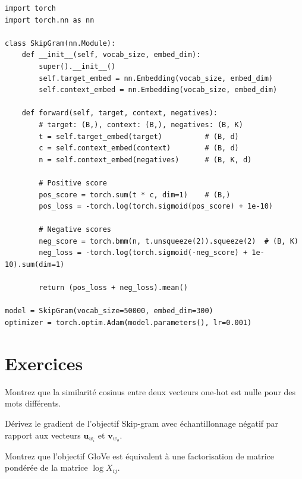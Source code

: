 \begin{codeblock}[title=\textbf{Entra\^inement Skip-gram avec PyTorch}]
\begin{verbatim}
import torch
import torch.nn as nn

class SkipGram(nn.Module):
    def __init__(self, vocab_size, embed_dim):
        super().__init__()
        self.target_embed = nn.Embedding(vocab_size, embed_dim)
        self.context_embed = nn.Embedding(vocab_size, embed_dim)

    def forward(self, target, context, negatives):
        # target: (B,), context: (B,), negatives: (B, K)
        t = self.target_embed(target)          # (B, d)
        c = self.context_embed(context)        # (B, d)
        n = self.context_embed(negatives)      # (B, K, d)

        # Positive score
        pos_score = torch.sum(t * c, dim=1)    # (B,)
        pos_loss = -torch.log(torch.sigmoid(pos_score) + 1e-10)

        # Negative scores
        neg_score = torch.bmm(n, t.unsqueeze(2)).squeeze(2)  # (B, K)
        neg_loss = -torch.log(torch.sigmoid(-neg_score) + 1e-10).sum(dim=1)

        return (pos_loss + neg_loss).mean()

model = SkipGram(vocab_size=50000, embed_dim=300)
optimizer = torch.optim.Adam(model.parameters(), lr=0.001)
\end{verbatim}
\end{codeblock}

\section{Exercices}
\label{sec:plg:exercices}

\begin{exercice}[$\star$]
Montrez que la similarit\'e cosinus entre deux vecteurs one-hot est nulle
pour des mots diff\'erents.
\end{exercice}

\begin{exercice}[$\star\star$]
D\'erivez le gradient de l'objectif Skip-gram avec \'echantillonnage n\'egatif
par rapport aux vecteurs $\mathbf{u}_{w_i}$ et $\mathbf{v}_{w_o}$.
\end{exercice}

\begin{exercice}[$\star\star$]
Montrez que l'objectif GloVe est \'equivalent \`a une factorisation de matrice
pond\'er\'ee de la matrice $\log X_{ij}$.
\end{exercice}


